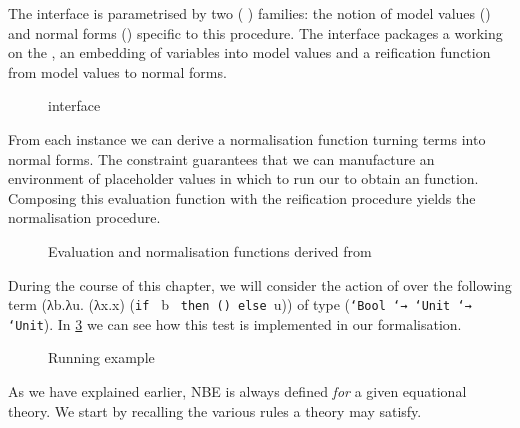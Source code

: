 The  interface is parametrised by two ( )
families: the notion of model values () and normal forms
() specific to this procedure. The interface packages a 
working on the , an embedding of variables into model values
and a reification function from model values to normal forms.

\begin{figure}[h]
\caption{ interface}\label{fig:nbeinterface}
\end{figure}

From each  instance we can derive a normalisation function turning
terms into normal forms. The  constraint guarantees that we can
manufacture an environment of placeholder values in which to run our
 to obtain an  function. Composing this evaluation
function with the reification procedure yields the normalisation procedure.

\begin{figure}[h]
\begin{minipage}[t]{0.55\textwidth}
\end{minipage}\begin{minipage}[t]{0.35\textwidth}
\end{minipage}
\caption{Evaluation and normalisation functions derived from }\label{fig:nbeinterface}
\end{figure}

During the course of this chapter, we will consider the action of 
over the following term (λb.λu. (λx.x) (\texttt{if~} b \texttt{~then~()~else~}u))
of type (\texttt{`Bool `→ `Unit `→ `Unit}). In \cref{fig:nbetest} we can see how this
test is implemented in our formalisation.

\begin{figure}[h]
\caption{Running example}\label{fig:nbetest}
\end{figure}

As we have explained earlier, NBE is always defined \emph{for} a given
equational theory. We start by recalling the various rules a theory may
satisfy.

